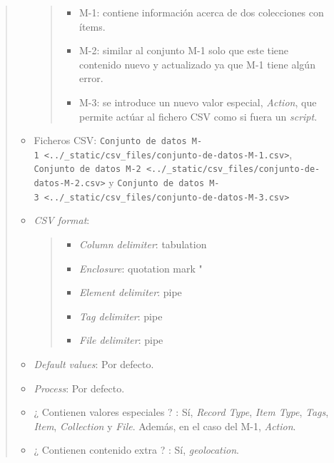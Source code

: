 \documentclass[
]{article}
\providecommand{\tightlist}{%
  \setlength{\itemsep}{0pt}\setlength{\parskip}{0pt}}
\begin{document}
\begin{itemize}
\begin{quote}
\begin{itemize}
    \begin{quote}
    \begin{itemize}
    \tightlist
    \item
      M-1: contiene información acerca de dos colecciones con ítems.
    \item
      M-2: similar al conjunto M-1 solo que este tiene contenido nuevo y
      actualizado ya que M-1 tiene algún error.
    \item
      M-3: se introduce un nuevo valor especial, \emph{Action}, que
      permite actúar al fichero CSV como si fuera un \emph{script}.
    \end{itemize}
    \end{quote}
  \item
    Ficheros CSV:
    \texttt{Conjunto\ de\ datos\ M-1\ \textless{}../\_static/csv\_files/conjunto-de-datos-M-1.csv\textgreater{}},
    \texttt{Conjunto\ de\ datos\ M-2\ \textless{}../\_static/csv\_files/conjunto-de-datos-M-2.csv\textgreater{}}
    y
    \texttt{Conjunto\ de\ datos\ M-3\ \textless{}../\_static/csv\_files/conjunto-de-datos-M-3.csv\textgreater{}}
  \item
    \emph{CSV format}:

    \begin{quote}
    \begin{itemize}
    \tightlist
    \item
      \emph{Column delimiter}: tabulation
    \item
      \emph{Enclosure}: quotation mark "
    \item
      \emph{Element delimiter}: pipe
    \item
      \emph{Tag delimiter}: pipe
    \item
      \emph{File delimiter}: pipe
    \end{itemize}
    \end{quote}
  \item
    \emph{Default values}: Por defecto.
  \item
    \emph{Process}: Por defecto.
  \item
    ¿ Contienen valores especiales ? : Sí, \emph{Record Type},
    \emph{Item Type}, \emph{Tags}, \emph{Item}, \emph{Collection} y
    \emph{File}. Además, en el caso del M-1, \emph{Action}.
  \item
    ¿ Contienen contenido extra ? : Sí, \emph{geolocation}.
  \end{itemize}
  \end{quote}
\end{itemize}
\end{document}
